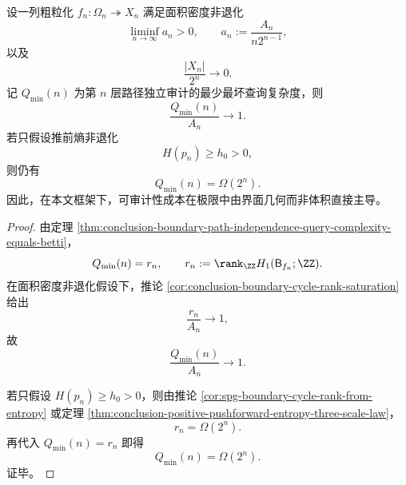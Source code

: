\begin{corollary}[审计复杂度与界面面积在极限中同一]\label{cor:conclusion-boundary-audit-complexity-area-equivalence}
设一列粗粒化 \(f_n:\Omega_n\twoheadrightarrow X_n\) 满足面积密度非退化
\[
\liminf_{n\to\infty}a_n>0,
\qquad
a_n:=\frac{A_n}{n2^{n-1}},
\]
以及
\[
\frac{|X_n|}{2^n}\to 0.
\]
记 \(Q_{\min}(n)\) 为第 \(n\) 层路径独立审计的最少最坏查询复杂度，则
\[
\frac{Q_{\min}(n)}{A_n}\to 1.
\]
若只假设推前熵非退化
\[
H(p_n)\ge h_0>0,
\]
则仍有
\[
Q_{\min}(n)=\Omega(2^n).
\]
因此，在本文框架下，可审计性成本在极限中由界面几何而非体积直接主导。
\end{corollary}
\begin{proof}
由定理 \ref{thm:conclusion-boundary-path-independence-query-complexity-equals-betti}，
\[
Q_{\min}(n)=r_n,
\qquad
r_n:=\rank_{\ZZ}H_1(\mathsf B_{f_n};\ZZ).
\]
在面积密度非退化假设下，推论 \ref{cor:conclusion-boundary-cycle-rank-saturation} 给出
\[
\frac{r_n}{A_n}\to 1,
\]
故
\[
\frac{Q_{\min}(n)}{A_n}\to 1.
\]

若只假设 \(H(p_n)\ge h_0>0\)，则由推论 \ref{cor:spg-boundary-cycle-rank-from-entropy} 或定理 \ref{thm:conclusion-positive-pushforward-entropy-three-scale-law}，
\[
r_n=\Omega(2^n).
\]
再代入 \(Q_{\min}(n)=r_n\) 即得
\[
Q_{\min}(n)=\Omega(2^n).
\]
证毕。
\end{proof}

\endinput
